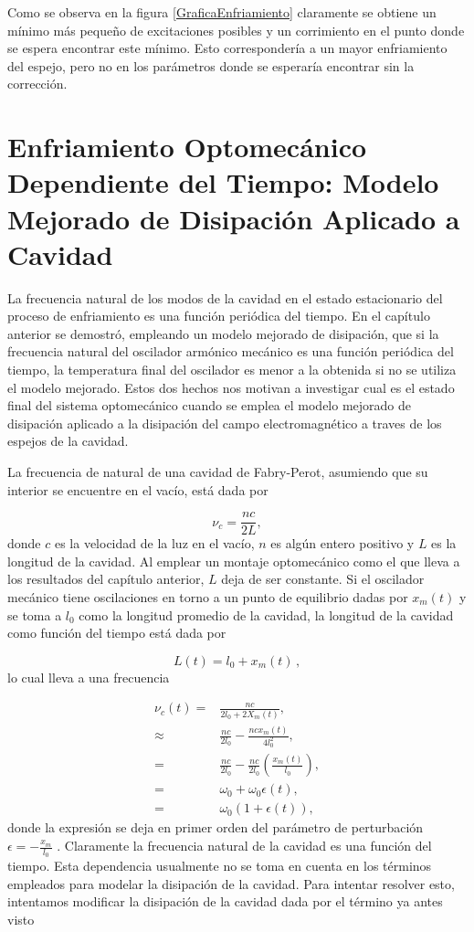 \documentclass[10pt,a4paper]{report}
\begin{document}
Como se observa en la figura \ref{GraficaEnfriamiento} claramente se obtiene un mínimo más pequeño de excitaciones posibles y un corrimiento en el punto donde se espera encontrar este mínimo. Esto correspondería a un mayor enfriamiento del espejo, pero no en los parámetros donde se esperaría encontrar sin la corrección.

\chapter{Enfriamiento Optomecánico Dependiente del Tiempo: Modelo Mejorado de Disipación Aplicado a Cavidad}

La frecuencia natural de los modos de la cavidad en el estado
  estacionario del proceso de enfriamiento es una función periódica
  del tiempo. En el capítulo anterior se demostró, empleando un modelo
  mejorado de disipación, que si la frecuencia natural del oscilador
  armónico mecánico es una función periódica del tiempo, la
  temperatura final del oscilador es menor a la obtenida si no se
  utiliza el modelo mejorado. Estos dos hechos nos motivan a
  investigar cual es el estado final del sistema optomecánico cuando
  se emplea el modelo mejorado de disipación aplicado a la disipación
  del campo electromagnético a traves de los espejos de la cavidad.

 
La frecuencia de natural de una cavidad de Fabry-Perot, asumiendo que su interior se encuentre en el vacío, está dada por

\begin{equation}
\nu_c = \frac{nc}{2L},
\end{equation}
donde $c$ es la velocidad de la luz en el vacío, $n$ es algún entero
positivo y $L$ es la longitud de la cavidad. Al emplear un montaje
optomecánico como el que lleva a los resultados del capítulo
anterior, $L$ deja de ser constante. Si el oscilador mecánico tiene
oscilaciones en torno a un punto de equilibrio dadas por $x_m(t)$ y se
toma a $l_0$ como la longitud promedio de la cavidad, la longitud de
la cavidad como función del tiempo está dada por

\begin{equation}
L(t) = l_0 + x_m(t)\, ,
\end{equation} lo cual lleva a una frecuencia 

\begin{align}
\nu_c(t) =& \frac{nc}{2l_0+2X_m(t)}, \\
\approx& \frac{nc}{2l_0} - \frac{nc x_m(t)}{4l_0^2}, \\
=& \frac{nc}{2l_0} - \frac{nc}{2l_0}(\frac{x_m(t)}{l_0}), \\
=& \omega_0 + \omega_0\epsilon(t), \\
=& \omega_0(1+\epsilon(t)),
\end{align} donde la expresión se deja en primer orden del parámetro de
perturbación $\epsilon = -\frac{x_m}{l_0}$ . Claramente la frecuencia natural de la cavidad es
una función del tiempo. Esta dependencia usualmente no se toma en
cuenta en los términos empleados para modelar la disipación de la
cavidad. Para intentar resolver esto, intentamos modificar la
disipación de la cavidad dada por el término ya antes visto
\end{document}
